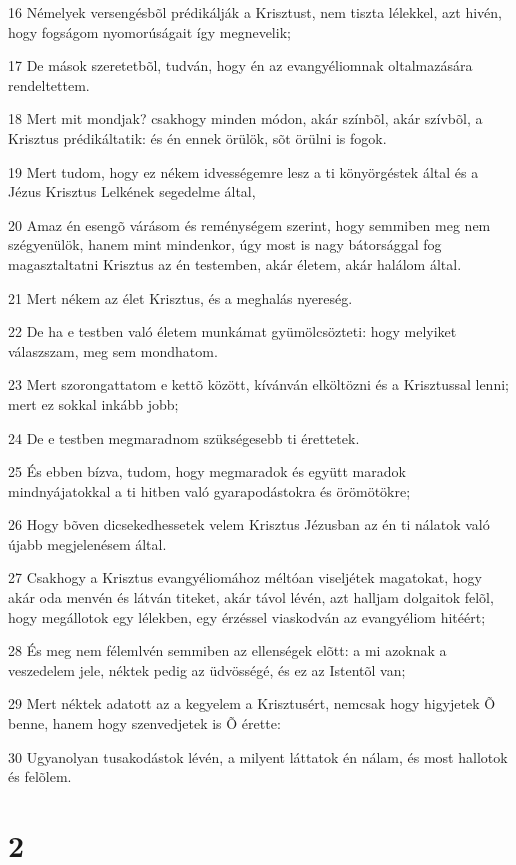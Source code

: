 \par 16 Némelyek versengésbõl prédikálják a Krisztust, nem tiszta lélekkel, azt hivén, hogy fogságom nyomorúságait így megnevelik;
\par 17 De mások szeretetbõl, tudván, hogy én az evangyéliomnak oltalmazására rendeltettem.
\par 18 Mert mit mondjak? csakhogy minden módon, akár színbõl, akár szívbõl, a Krisztus prédikáltatik: és én ennek örülök, sõt örülni is fogok.
\par 19 Mert tudom, hogy ez nékem idvességemre lesz a ti könyörgéstek által és a Jézus Krisztus Lelkének segedelme által,
\par 20 Amaz én esengõ várásom és reménységem szerint, hogy semmiben meg nem szégyenülök, hanem mint mindenkor, úgy most is nagy bátorsággal fog magasztaltatni Krisztus az én testemben, akár életem, akár halálom által.
\par 21 Mert nékem az élet Krisztus, és a meghalás nyereség.
\par 22 De ha e testben való életem munkámat gyümölcsözteti: hogy melyiket válaszszam, meg sem mondhatom.
\par 23 Mert szorongattatom e kettõ között, kívánván elköltözni és a Krisztussal lenni; mert ez sokkal inkább jobb;
\par 24 De e testben megmaradnom szükségesebb ti érettetek.
\par 25 És ebben bízva, tudom, hogy megmaradok és együtt maradok mindnyájatokkal a ti hitben való gyarapodástokra és örömötökre;
\par 26 Hogy bõven dicsekedhessetek velem Krisztus Jézusban az én ti nálatok való újabb megjelenésem által.
\par 27 Csakhogy a Krisztus evangyéliomához méltóan viseljétek magatokat, hogy akár oda menvén és látván titeket, akár távol lévén, azt halljam dolgaitok felõl, hogy megállotok egy lélekben, egy érzéssel viaskodván az evangyéliom hitéért;
\par 28 És meg nem félemlvén semmiben az ellenségek elõtt: a mi azoknak a veszedelem jele, néktek pedig az üdvösségé, és ez az Istentõl van;
\par 29 Mert néktek adatott az a kegyelem a Krisztusért, nemcsak hogy higyjetek Õ benne, hanem hogy szenvedjetek is Õ érette:
\par 30 Ugyanolyan tusakodástok lévén, a milyent láttatok én nálam, és most hallotok és felõlem.

\chapter{2}

